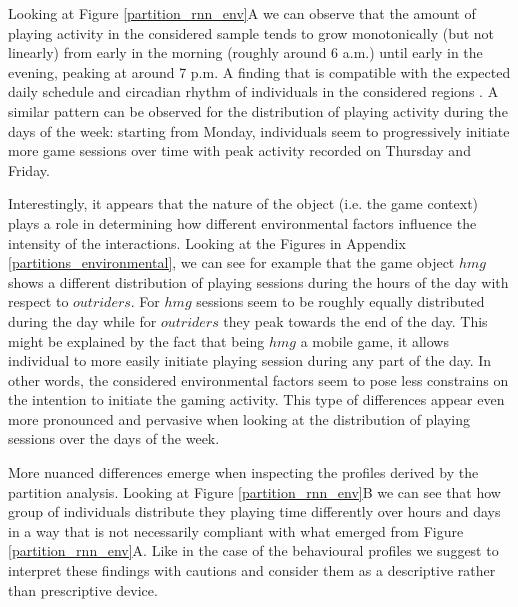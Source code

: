 Looking at Figure \ref{partition_rnn_env}A we can observe that the amount of playing activity in the considered sample tends to grow monotonically (but not linearly) from early in the morning (roughly around 6 a.m.) until early in the evening, peaking at around 7 p.m. A finding that is compatible with the expected daily schedule and circadian rhythm of individuals in the considered regions \cite{vitaterna2001overview}. A similar pattern can be observed for the distribution of playing activity during the days of the week: starting from Monday, individuals seem to progressively initiate more game sessions over time with peak activity recorded on Thursday and Friday. 

Interestingly, it appears that the nature of the object (i.e. the game context) plays a role in determining how different environmental factors influence the intensity of the interactions. Looking at the Figures in Appendix \ref{partitions_environmental}, we can see for example that the game object $hmg$ shows a different distribution of playing sessions during the hours of the day with respect to $outriders$. For $hmg$ sessions seem to be roughly equally distributed during the day while for $outriders$ they peak towards the end of the day. This might be explained by the fact that being $hmg$ a mobile game, it allows individual to  more easily initiate playing session during any part of the day. In other words, the considered environmental factors seem to pose less constrains on the intention to initiate the gaming activity. This type of differences appear even more pronounced and pervasive when looking at the distribution of playing sessions over the days of the week. 

More nuanced differences emerge when inspecting the profiles derived by the partition analysis. Looking at Figure \ref{partition_rnn_env}B we can see that how group of individuals distribute they playing time differently over hours and days in a way that is not necessarily compliant with what emerged from Figure \ref{partition_rnn_env}A. Like in the case of the behavioural profiles we suggest to interpret these findings with cautions and consider them as a descriptive rather than prescriptive device. 

